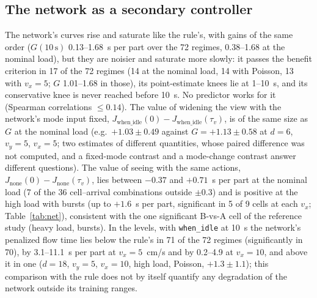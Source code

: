 \documentclass[11pt,a4paper]{article}
\newcommand{\tv}{\tau_{v}}
\begin{document}
\subsection{The network as a secondary controller}\label{sec:benchnet}
The network's curves rise and saturate like the rule's, with gains of the same order
($G(10\,\mathrm{s})$ 0.13--1.68~s per part over the 72 regimes, 0.38--1.68 at the nominal
load), but they are noisier and saturate more slowly: it passes the benefit criterion in
17 of the 72 regimes (14 at the nominal load, 14 with Poisson, 13 with $v_x=5$; $G$
1.01--1.68 in those), its point-estimate knees lie at 1--10~s, and its conservative knee is never
reached before 10~s. No predictor works for it (Spearman correlations $\le0.14$). The
value of widening the view with the network's mode input fixed,
$J_{\mathrm{when\_idle}}(0)-J_{\mathrm{when\_idle}}(\tv)$, is of the same size as $G$ at the
nominal load (e.g.\ $+1.03\pm0.49$ against $G=+1.13\pm0.58$ at $d=6$, $v_y=5$, $v_x=5$;
two estimates of different quantities, whose paired difference was not computed, and a
fixed-mode contrast and a mode-change contrast answer different questions). The value of seeing with
the same actions, $J_{\mathrm{none}}(0)-J_{\mathrm{none}}(\tv)$, lies between $-0.37$ and
$+0.71$~s per part at the nominal load (7 of the 36 cell--arrival combinations outside
$\pm0.3$) and is positive at the high load with bursts (up to $+1.6$~s per
part, significant in 5 of 9 cells at each $v_x$; Table~\ref{tab:net}), consistent with
the one significant B-vs-A cell of the reference study (heavy load, bursts). In the levels, with
\texttt{when\_idle} at 10~s the network's penalized flow time lies below the rule's in 71
of the 72 regimes (significantly in 70), by 3.1--11.1~s per part at $v_x=5$~cm/s and by
0.2--4.9 at $v_x=10$, and above it in one ($d=18$, $v_y=5$, $v_x=10$, high load, Poisson,
$+1.3\pm1.1$); this comparison with the rule does not by itself quantify any degradation
of the network outside its training ranges.

\begin{table}[t]
\centering\small
\caption{Geometry bench, network: per block of $v_x\times$load$\times$arrivals (nine
geometries each), the number of cells worth sizing for, the range of $G(10\,\mathrm{s})$,
the range of the point-estimate knee in those cells, and the range of the value of seeing
with the same actions, $J_{\mathrm{none}}(0)-J_{\mathrm{none}}(10\,\mathrm{s})$ [s per
part], with the number of cells in which it is significantly positive (cells in which it
is significantly negative, one in each of four blocks, are not counted).}
\label{tab:net}
\resizebox{\linewidth}{!}{}
\end{table}
\end{document}
